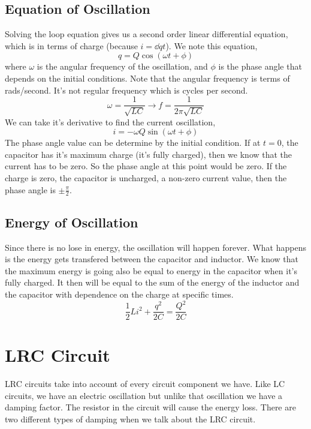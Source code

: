 \subsection{Equation of Oscillation}
Solving the loop equation gives us a second order linear differential equation, which is in terms of charge (because $i = \dd{q}{t}$). We note this equation,
\begin{equation*}
	q = Q\cos(\omega t + \phi )
\end{equation*}	
where $\omega$ is the angular frequency of the oscillation, and $\phi$ is the phase angle that depends on the initial conditions. Note that the angular frequency is terms of rads/second. It's not regular frequency which is cycles per second.
\begin{equation*}
	\omega = \frac{1}{\sqrt{LC}} \to f = \frac{1}{2\pi\sqrt{LC}}
\end{equation*}
We can take it's derivative to find the current oscillation, 
\begin{equation*}
	i = -\omega Q\sin(\omega t + \phi)
\end{equation*}
The phase angle value can be determine by the initial condition. If at $t=0$, the capacitor has it's maximum charge (it's fully charged), then we know that the current has to be zero. So the phase angle at this point would be zero. If the charge is zero, the capacitor is uncharged, a non-zero current value, then the phase angle is $\pm \frac{\pi}{2}$.

\subsection{Energy of Oscillation}
Since there is no lose in energy, the oscillation will happen forever. What happens is the energy gets transfered between the capacitor and inductor. We know that the maximum energy is going also be equal to energy in the capacitor when it's fully charged. It then will be equal to the sum of the energy of the inductor and the capacitor with dependence on the charge at specific times. 
\begin{equation*}
	\frac{1}{2}Li^2 + \frac{q^2}{2C} = \frac{Q^2}{2C}
\end{equation*}

\section{LRC Circuit}
LRC circuits take into account of every circuit component we have. Like LC circuits, we have an electric oscillation but unlike that oscillation we have a damping factor. The resistor in the circuit will cause the energy loss. There are two different types of damping when we talk about the LRC circuit. 

